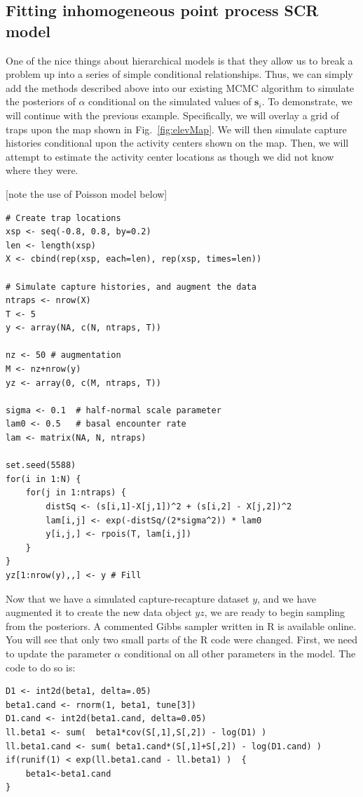 \subsection{Fitting inhomogeneous point process SCR model}

One
of the nice things about hierarchical models is that they allow us to
break a problem up into a series of simple conditional
relationships. Thus,
we can simply add the methods described above into our existing MCMC
algorithm to simulate the posteriors of $\alpha$ conditional on the
simulated values of $\mathbf{s}_i$. To demonstrate, we will continue with
the previous example. Specifically, we will overlay a grid of
traps upon the map shown in Fig.~\ref{fig:elevMap}. We will then
simulate capture histories conditional upon the activity centers shown
on the map. Then, we will attempt to estimate the activity center
locations as though we did not know where they were.


[note the use of Poisson model below]

\begin{small}
\begin{verbatim}
# Create trap locations
xsp <- seq(-0.8, 0.8, by=0.2)
len <- length(xsp)
X <- cbind(rep(xsp, each=len), rep(xsp, times=len))

# Simulate capture histories, and augment the data
ntraps <- nrow(X)
T <- 5
y <- array(NA, c(N, ntraps, T))

nz <- 50 # augmentation
M <- nz+nrow(y)
yz <- array(0, c(M, ntraps, T))

sigma <- 0.1  # half-normal scale parameter
lam0 <- 0.5   # basal encounter rate
lam <- matrix(NA, N, ntraps)

set.seed(5588)
for(i in 1:N) {
    for(j in 1:ntraps) {
        distSq <- (s[i,1]-X[j,1])^2 + (s[i,2] - X[j,2])^2
        lam[i,j] <- exp(-distSq/(2*sigma^2)) * lam0
        y[i,j,] <- rpois(T, lam[i,j])
    }
}
yz[1:nrow(y),,] <- y # Fill
\end{verbatim}
\end{small}

Now that we have a simulated capture-recapture dataset $y$, and we have
augmented it to create the new data object $yz$, we are ready to
begin sampling from the posteriors. A commented Gibbs sampler written in R is
available online. You will see that only two small parts of the R code
were changed. First, we need to update the parameter $\alpha$
conditional on all other parameters in the model. The code to do so is:

\begin{small}
\begin{verbatim}
D1 <- int2d(beta1, delta=.05)
beta1.cand <- rnorm(1, beta1, tune[3])
D1.cand <- int2d(beta1.cand, delta=0.05)
ll.beta1 <- sum(  beta1*cov(S[,1],S[,2]) - log(D1) )
ll.beta1.cand <- sum( beta1.cand*(S[,1]+S[,2]) - log(D1.cand) )
if(runif(1) < exp(ll.beta1.cand - ll.beta1) )  {
    beta1<-beta1.cand
}
\end{verbatim}
\end{small}

